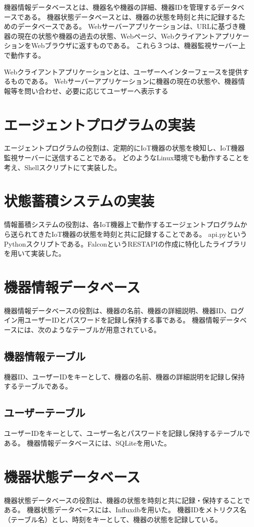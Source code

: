 機器情報データベースとは、機器名や機器の詳細、機器IDを管理するデータベースである。
機器状態データベースとは、機器の状態を時刻と共に記録するためのデータベースである。
Webサーバーアプリケーションは、URLに基づき機器の現在の状態や機器の過去の状態、Webページ、WebクライアントアプリケーションをWebブラウザに返すものである。
これら３つは、機器監視サーバー上で動作する。
\medskip

Webクライアントアプリケーションとは、ユーザーへインターフェースを提供するものである。
Webサーバーアプリケーションに機器の現在の状態や、機器情報等を問い合わせ、必要に応じてユーザーへ表示する

\section{エージェントプログラムの実装}
エージェントプログラムの役割は、定期的にIoT機器の状態を検知し、IoT機器監視サーバーに送信することである。
どのようなLinux環境でも動作することを考え、Shellスクリプトにて実装した。

\section{状態蓄積システムの実装}
情報蓄積システムの役割は、各IoT機器上で動作するエージェントプログラムから送られてきたIoT機器の状態を時刻と共に記録することである。
api.pyというPythonスクリプトである。FalconというRESTAPIの作成に特化したライブラリを用いて実装した。

\section{機器情報データベース}
機器情報データベースの役割は、機器の名前、機器の詳細説明、機器ID、ログイン用ユーザーIDとパスワードを記録し保持する事である。
機器情報データベースには、次のようなテーブルが用意されている。
\subsection{機器情報テーブル}
機器ID、ユーザーIDをキーとして、機器の名前、機器の詳細説明を記録し保持するテーブルである。
\subsection{ユーザーテーブル}
ユーザーIDをキーとして、ユーザー名とパスワードを記録し保持するテーブルである。
機器情報データベースには、SQLiteを用いた。

\section{機器状態データベース}
機器状態データベースの役割は、機器の状態を時刻と共に記録・保持することである。
機器状態データベースには、Influxdbを用いた。
機器IDをメトリクス名（テーブル名）とし、時刻をキーとして、機器の状態を記録している。

